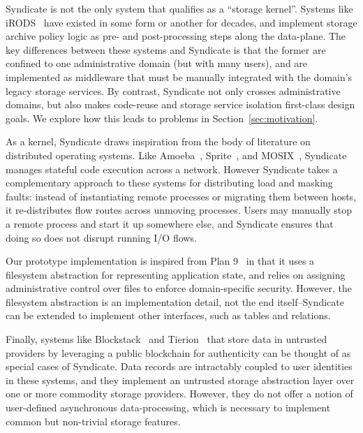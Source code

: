 Syndicate is not the only system that qualifies as a ``storage kernel''.
Systems like iRODS~\cite{irods} have existed in some form or another for
decades, and implement storage archive policy logic as pre- and post-processing steps
along the data-plane.  The key differences between these systems and Syndicate is
that the former are confined to one administrative domain (but with many users), and
are implemented as middleware that must be manually integrated with the domain's
legacy storage services.  By contrast, Syndicate not only crosses administrative
domains, but also makes code-reuse and storage service isolation first-class
design goals.  We explore how this leads to problems in
Section~\ref{sec:motivation}.

As a kernel, Syndicate draws inspiration from the body of literature on distributed
operating systems.  Like Amoeba~\cite{amoeba}, Sprite~\cite{sprite}, and
MOSIX~\cite{mosix}, Syndicate manages stateful code
execution across a network.  However Syndicate takes a complementary approach to
these systems for distributing load and masking faults:  instead of instantiating remote processes
or migrating them between hosts, it re-distributes flow routes across unmoving
processes.  Users may manually stop a remote process and start it up somewhere
else, and Syndicate ensures that doing so does not disrupt running I/O flows.

Our prototype implementation is inspired from Plan
9~\cite{plan9} in that it uses a filesystem abstraction for representing
application state, and relies on assigning administrative control over files to
enforce domain-specific security.  However, the filesystem abstraction is an
implementation detail, not the end itself--Syndicate can be extended to
implement other interfaces, such as tables and relations.

Finally, systems like Blockstack~\cite{blockstack} and Tierion~\cite{tierion}
that store data in untrusted providers by leveraging a public blockchain for
authenticity can be thought of as special cases of Syndicate.  Data records are intractably coupled
to user identities in these systems, and they implement an untrusted storage abstraction layer over
one or more commodity storage providers.  However, they do not offer a notion of
user-defined asynchronous data-processing, which is necessary to implement common but
non-trivial storage features.

